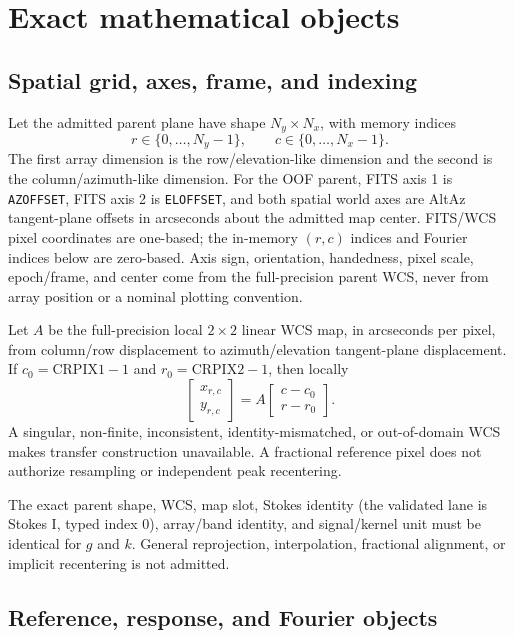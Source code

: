 \documentclass[11pt]{article}
\begin{document}
\section{Exact mathematical objects}

\subsection{Spatial grid, axes, frame, and indexing}

Let the admitted parent plane have shape $N_y\times N_x$, with memory indices
\[
 r\in\{0,\ldots,N_y-1\},\qquad c\in\{0,\ldots,N_x-1\}.
\]
The first array dimension is the row/elevation-like dimension and the second
is the column/azimuth-like dimension.  For the OOF parent, FITS axis 1 is
\texttt{AZOFFSET}, FITS axis 2 is \texttt{ELOFFSET}, and both spatial world
axes are AltAz tangent-plane offsets in arcseconds about the admitted map
center.  FITS/WCS pixel coordinates are one-based; the in-memory $(r,c)$
indices and Fourier indices below are zero-based.  Axis sign, orientation,
handedness, pixel scale, epoch/frame, and center come from the full-precision
parent WCS, never from array position or a nominal plotting convention.

Let $A$ be the full-precision local $2\times2$ linear WCS map, in
arcseconds per pixel, from column/row displacement to
azimuth/elevation tangent-plane displacement.  If
$c_0=\mathrm{CRPIX1}-1$ and $r_0=\mathrm{CRPIX2}-1$, then locally
\[
 \begin{bmatrix}x_{r,c}\\y_{r,c}\end{bmatrix}
 = A\begin{bmatrix}c-c_0\\r-r_0\end{bmatrix}.
\]
A singular, non-finite, inconsistent, identity-mismatched, or out-of-domain
WCS makes transfer construction unavailable.  A fractional reference pixel
does not authorize resampling or independent peak recentering.

The exact parent shape, WCS, map slot, Stokes identity (the validated lane is
Stokes I, typed index 0), array/band identity, and signal/kernel unit must be
identical for $g$ and $k$.  General reprojection, interpolation, fractional
alignment, or implicit recentering is not admitted.

\subsection{Reference, response, and Fourier objects}
\end{document}
